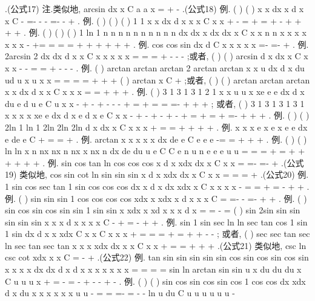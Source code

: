 \int 
\int 
.(公式17) 
\textcolor{lyred}{注}.类似地,
arcsin
dx
x
C
a
a
x
=
+
-
\int 
.(公式18) 
\textcolor{lyred}{例}.
(
)
(
)
x
x dx
x d
x
x
C
-
=-
-
-
=-
-
+
\int 
\int 
. 
\textcolor{lyred}{例}.
(
)
(
)
(
)
1 1
x
x
dx
d x
x
x
C
x
x
+
-
=
+
=
+
-
+
+
+
+
\int 
\int 
. 
\textcolor{lyred}{例}.
(
)
(
)
(
)
1 ln 1
n
n
n
n
n
n
n
n
n
n
dx
dx
x
dx
dx
x
C
x
x
n
n
x
x
x
x
x
x
x
-
+=
=
=
=
+
+
+
+
+
+
\int 
\int 
\int 
\int 
. 
\textcolor{lyred}{例}.
cos
cos
sin
dx
d
C
x
x
x
x
x
=-
=-
+
\int 
\int 
. 
\textcolor{lyred}{例}.
2arcsin 2
dx
dx
d
x
x
C
x
x
x
x
x
=
=
=
+
-
-
-
\int 
\int 
\int 
;或者, 
(
)
(
)
arcsin
d x
dx
x
C
x
x
x
-
-
=
=
+
-
-
-
\int 
\int 
. 
\textcolor{lyred}{例}.
(
)
arctan
arctan
arctan
2 arctan
arctan
x
x
u
dx
d
x
du
ud
u
x
u
x
x
=
=
=
=
+
+
+
\int 
\int 
\int 
\int 
(
)
arctan
x
C
+
;或者,
(
)
(
)
arctan
arctan
arctan
x
x
dx
d x
x
C
x
x
x
=
=
+
+
+
\int 
\int 
. 
\textcolor{lyred}{例}.
(
)
3 1
3 1
3 1
2 1
x
x
u
u
x
xe
e
e
dx
d
x
du
e
d u
e
C
u
x
x
-
+
-
+
-
-
-
+
=
+
=
=
=-
+
+
+
\int 
\int 
\int 
\int 
; 
或者,
(
)
3 1
3 1
3 1
3 1
x
x
x
x
xe
e
dx
d
x
e
d
x
e
C
x
x
-
+
-
+
-
+
-
+
=
+
=
+
=-
+
+
+
\int 
\int 
\int 
. 
\textcolor{lyred}{例}.
(
)
(
)
2ln
1 ln 1
2ln
2ln
2ln
d
x
dx
x
C
x
x
x
+
=
=
+
+
+
+
\int 
\int 
. 
\textcolor{lyred}{例}.
x
x
x
e
x
e
x
e
e
dx
e de
e
C
+
=
=
+
\int 
\int 
. 
\textcolor{lyred}{例}.
arctan
x
x
x
x
x
dx
de
e
C
e
e
e
-=
=
+
+
+
\int 
\int 
. 
\textcolor{lyred}{例}.
(
)
(
)
ln
ln
x
n
nx
nx
n
nx
x
nx
n
dx
de
du
u
e
C
C
e
n
u
n
e
e
e
u
u
=
=
=
+
=
+
+
+
+
+
+
\int 
\int 
\int 
. 
\textcolor{lyred}{例}.
sin
cos
tan
ln cos
cos
cos
x
d
x
xdx
dx
x
C
x
x
=
=-
=-
+
\int 
\int 
\int 
.(公式19) 
类似地,
cos
sin
cot
ln sin
sin
sin
x
d
x
xdx
dx
x
C
x
x
=
=
=
+
\int 
\int 
\int 
.(公式20) 
\textcolor{lyred}{例}.
1 sin
cos
sec
tan
1 sin
cos
cos
cos
dx
x
d
x
dx
xdx
x
C
x
x
x
x
-
=
=
+
=
-
+
+
\int 
\int 
\int 
\int 
. 
\textcolor{lyred}{例}.
(
)
sin
sin
sin
1 cos
cos
cos
cos
xdx
x
xdx
x d
x
x
x
C
=
=-
-
=-
+
+
\int 
\int 
\int 
. 
\textcolor{lyred}{例}.
(
)
sin
cos
sin
cos
sin
sin
1 sin
sin
x
xdx
x
xd
x
x
x
d
x
=
=
-
=
\int 
\int 
\int 
(
)
sin
2sin
sin
sin
sin
sin
sin
x
x
x d
x
x
x
x
C
-
+
=
-
+
+
\int 
. 
\textcolor{lyred}{例}.
sin
1 sin
sec
ln
ln sec
tan
cos
1 sin
1 sin
dx
d
x
x
xdx
C
x
x
C
x
x
x
+
=
=
=
+
=
+
+
-
-
\int 
\int 
\int 
; 
或者,
(
)
sec
sec
tan
sec
ln sec
tan
sec
tan
x
x
x
xdx
dx
x
x
C
x
x
+
=
=
+
+
+
\int 
\int 
.(公式21) 
类似地, csc
ln csc
cot
xdx
x
x
C
=
-
+
\int 
.(公式22) 
\textcolor{lyred}{例}.
tan
sin
sin
sin
sin
sin
cos
sin
cos
sin
cos
sin
x
x
x
x
dx
dx
d
x
d
x
x
x
x
x
x
x
=
=
=
=
\int 
\int 
\int 
\int 
sin
ln
arctan
sin
sin
u
x
du
du
du
x
C
u
u
u
x
+
=
-
=
-
+
-
-
+
-
\int 
\int 
\int 
. 
\textcolor{lyred}{例}.
(
)
(
)
sin
cos
sin cos
sin
cos
1 cos
cos
dx
xdx
d
x
du
x
x
x
x
x
x
u
u
-
=
=
=-
=
-
-
\int 
\int 
\int 
\int 
ln
u
du
C
u
u
u
u
u
u
-


